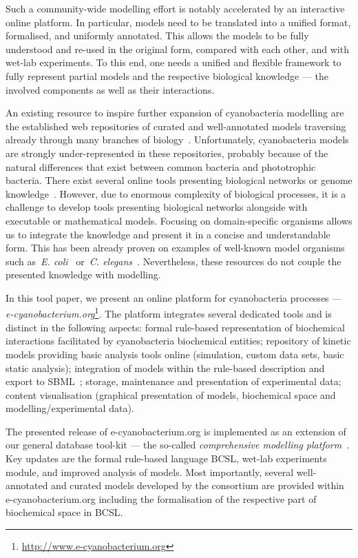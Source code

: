 \documentclass[runningheads]{llncs}
\begin{document}
Such a community-wide modelling effort is notably accelerated by an interactive online platform. In particular, models need to be translated into a unified format, formalised, and uniformly annotated. This allows the models to be fully understood and re-used in the original form, compared with each other, and with wet-lab experiments. To this end, one needs a unified and flexible framework to fully represent partial models and the respective biological knowledge --- the involved components as well as their interactions.  

An existing resource to inspire further expansion of cyanobacteria modelling are the established web repositories of curated and well-annotated models traversing already through many branches of biology~\cite{beard2009cellml,LeNovere2006,Olivier01092004,Kanehisa04012016}.
Unfortunately, cyanobacteria models are strongly under-represented in these repositories, probably because of the natural differences that exist between common bacteria and phototrophic bacteria. There exist several online tools presenting biological networks or genome knowledge~\cite{Croft01012014,Kanehisa04012016,go}. However, due to enormous complexity of biological processes, it is a challenge to develop tools presenting biological networks alongside with executable or mathematical models. Focusing on domain-specific organisms allows us to integrate the knowledge and present it in a concise and understandable form. This has been already proven on examples of well-known model organisms such as~\emph{E. coli}~\cite{Keseler01012013} or~\emph{C. elegans}~\cite{Harris01012010}. Nevertheless, these resources do not couple the presented knowledge with modelling.

In this tool paper, we present an online platform for cyanobacteria processes --- \emph{e-cyanobacterium.org}\footnote{\url{http://www.e-cyanobacterium.org}}. The platform integrates several dedicated tools and is distinct in the following aspects: formal rule-based representation of biochemical interactions facilitated by cyanobacteria biochemical entities; repository of kinetic models providing basic analysis tools online (simulation, custom data sets, basic static analysis); integration of models within the rule-based description and export to SBML~\cite{Hucka01032003}; storage, maintenance and presentation of experimental data; 
content visualisation (graphical presentation of models, biochemical space and modelling/experimental data).

The presented release of e-cyanobacterium.org is implemented as an extension of our general database tool-kit --- the so-called \emph{comprehensive modelling platform}~\cite{cs2bio2013}. Key updates are the formal rule-based language BCSL, wet-lab experiments module, and improved analysis of models. Most importantly, several well-annotated and curated models developed by the consortium are provided within  e-cyanobacterium.org including the formalisation of the respective part of biochemical space in BCSL. 
\end{document}
